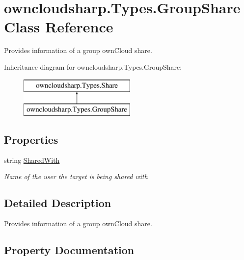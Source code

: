 \hypertarget{classowncloudsharp_1_1_types_1_1_group_share}{}\section{owncloudsharp.\+Types.\+Group\+Share Class Reference}
\label{classowncloudsharp_1_1_types_1_1_group_share}


Provides information of a group own\+Cloud share.  


Inheritance diagram for owncloudsharp.\+Types.\+Group\+Share\+:\begin{figure}[H]
\begin{center}
\leavevmode
\includegraphics[height=2.000000cm]{classowncloudsharp_1_1_types_1_1_group_share}
\end{center}
\end{figure}
\subsection*{Properties}
\begin{DoxyCompactItemize}
\item 
string \hyperlink{classowncloudsharp_1_1_types_1_1_group_share_a6b51436f6f51780137ff9640b15d9e9c}{Shared\+With}
\begin{DoxyCompactList}\small\item\em Name of the user the target is being shared with \end{DoxyCompactList}\end{DoxyCompactItemize}


\subsection{Detailed Description}
Provides information of a group own\+Cloud share. 



\subsection{Property Documentation}
\hypertarget{classowncloudsharp_1_1_types_1_1_group_share_a6b51436f6f51780137ff9640b15d9e9c}{}
